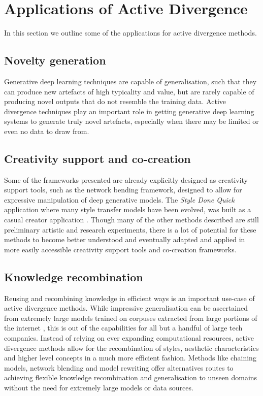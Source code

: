 \section{Applications of Active Divergence}

In this section we outline some of the applications for active divergence methods. 

\subsection{Novelty generation}

Generative deep learning techniques are capable of generalisation, such that they can produce new artefacts of high typicality and value, but are rarely capable of producing novel outputs that do not resemble the training data. Active divergence techniques play an important role in getting generative deep learning systems to generate truly novel artefacts, especially when there may be limited or even no data to draw from. 

\subsection{Creativity support and co-creation}

Some of the frameworks presented are already explicitly designed as creativity support tools, such as the network bending framework, designed to allow for expressive manipulation of deep generative models. The \textit{Style Done Quick} \citep{colton2021evolving} application where many style transfer models have been evolved, was built as a casual creator application \citep{compton2015casual}. Though many of the other methods described are still preliminary artistic and research experiments, there is a lot of potential for these methods to become better understood and eventually adapted and applied in more easily accessible creativity support tools and co-creation frameworks. 

\subsection{Knowledge recombination}

Reusing and recombining knowledge in efficient ways is an important use-case of active divergence methods. While impressive generalisation can be ascertained from extremely large models trained on corpuses extracted from large portions of the internet \citep{ramesh2021zero}, this is out of the capabilities for all but a handful of large tech companies. Instead of relying on ever expanding computational resources, active divergence methods allow for the recombination of styles, aesthetic characteristics and higher level concepts in a much more efficient fashion. Methods like chaining models, network blending and model rewriting offer alternatives routes to achieving flexible knowledge recombination and generalisation to unseen domains without the need for extremely large models or data sources. 



